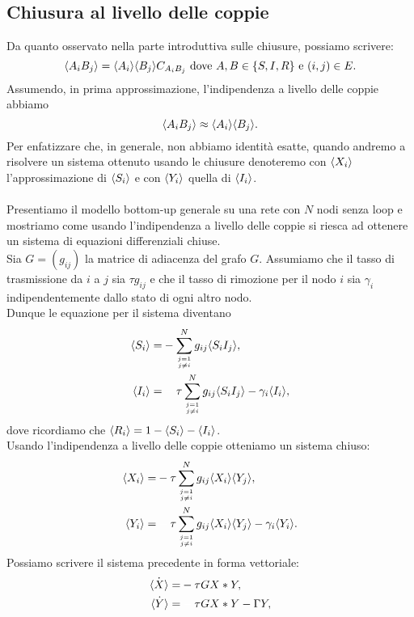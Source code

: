 \subsection{Chiusura al livello delle coppie}
Da quanto osservato nella parte introduttiva sulle chiusure, possiamo scrivere:
$$ \langle  A_i B_j \rangle = \langle  A_i \rangle \langle B_j \rangle C_{A_i B_j} \text{ dove } A,B\in \{S,I,R\} \text{ e } (i,j)\in E.$$ 
Assumendo, in prima approssimazione, l'indipendenza a livello delle coppie abbiamo 
$$ \langle  A_i B_j \rangle \approx \langle A_i \rangle\langle B_j \rangle.$$ 
Per enfatizzare che, in generale, non abbiamo identit\`a esatte, quando andremo a risolvere un sistema ottenuto usando le chiusure denoteremo  con $\langle X_i \rangle$ l'approssimazione di $\langle  S_i \rangle$ e con $\langle  Y_i \rangle$ quella di $\langle  I_i \rangle$.\\ \\
Presentiamo il modello bottom-up generale su una rete con $N$ nodi senza loop e mostriamo come usando l'indipendenza a livello delle coppie si riesca ad ottenere un sistema di equazioni differenziali chiuse.\\
Sia $G=(g_{ij})$ la matrice di adiacenza del grafo $G$. Assumiamo che il tasso di trasmissione da $i$ a $j$ sia $\tau g_{ij}$ e che il tasso di rimozione per il nodo $i$ sia $\gamma_i$ indipendentemente dallo stato di ogni altro nodo.\\
Dunque le equazione per il sistema diventano
\begin{equation}
\begin{aligned}
	 \angol{ S_i} =& - \sum_{j=1\atop{j\neq i }}^N g_{ij} \angol{ S_i I_j},\\
	 \angol{I_i} =&\spa \tau \sum_{j=1\atop{j\neq i}}^N  g_{ij} \angol{ S_i I_j} -\gamma_i \angol{I_i},
\end{aligned}
\end{equation}
dove ricordiamo che $\langle R_i \rangle=1-\langle S_i \rangle- \langle I_i \rangle$.\\
Usando l'indipendenza a livello delle coppie otteniamo  un sistema chiuso: 
\begin{equation}
\begin{aligned}
	 \angol{ X_i} =& -\tau \sum_{j=1\atop{j\neq i }}^N g_{ij}\angol{ X_i} \angol{Y_j},\\
	 \angol{Y_i} =&\spa \tau \sum_{j=1\atop{j\neq i}}^N  g_{ij}\angol{ X_i}\angol{Y_j} -\gamma_i \angol{Y_i}.
\end{aligned}
\label{Chiuso_coppie}
\end{equation}
Possiamo scrivere il sistema precedente in forma vettoriale:
\begin{equation}
	\begin{aligned}
	\dot{\angol{X}} = & - \tau G X * Y,\\
	\dot{\angol{Y}}=& \spa \tau G X * Y - \Gamma Y,	
	\end{aligned}
\end{equation}

